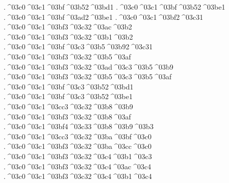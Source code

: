 {.^^^^03c0^^^^03c1^^^^03bf^^^^03b52^^^^03bd1 		%
.^^^^03c0^^^^03c1^^^^03bf^^^^03b52^^^^03be1 		%
.^^^^03c0^^^^03c1^^^^03bf^^^^03ad2^^^^03be1 		%
.^^^^03c0^^^^03c1^^^^03bf2^^^^03c31
	.^^^^03c0^^^^03c1^^^^03bf3^^^^03c32^^^^03ac^^^^03b2 		%
	.^^^^03c0^^^^03c1^^^^03bf3^^^^03c32^^^^03b1^^^^03b2
.^^^^03c0^^^^03c1^^^^03bf^^^^03c3^^^^03b5^^^^03b92^^^^03c31 		%
	.^^^^03c0^^^^03c1^^^^03bf3^^^^03c32^^^^03b5^^^^03af 		%
	.^^^^03c0^^^^03c1^^^^03bf3^^^^03c32^^^^03ad^^^^03c3^^^^03b5^^^^03b9
	.^^^^03c0^^^^03c1^^^^03bf3^^^^03c32^^^^03b5^^^^03c3^^^^03b5^^^^03af
.^^^^03c0^^^^03c1^^^^03bf^^^^03c3^^^^03b52^^^^03bd1 		%
.^^^^03c0^^^^03c1^^^^03bf^^^^03c3^^^^03b52^^^^03be1 		%
	.^^^^03c0^^^^03c1^^^^03cc3^^^^03c32^^^^03b8^^^^03b9 		%
	.^^^^03c0^^^^03c1^^^^03bf3^^^^03c32^^^^03b8^^^^03af
		.^^^^03c0^^^^03c1^^^^03bf4^^^^03c33^^^^03b8^^^^03b9^^^^03b3 		%
	.^^^^03c0^^^^03c1^^^^03cc3^^^^03c32^^^^03ba^^^^03bf^^^^03c0 		%
	.^^^^03c0^^^^03c1^^^^03bf3^^^^03c32^^^^03ba^^^^03cc^^^^03c0 
	.^^^^03c0^^^^03c1^^^^03bf3^^^^03c32^^^^03c4^^^^03b1^^^^03c3 		%
	.^^^^03c0^^^^03c1^^^^03bf3^^^^03c32^^^^03c4^^^^03ac^^^^03c4 		%
	.^^^^03c0^^^^03c1^^^^03bf3^^^^03c32^^^^03c4^^^^03b1^^^^03c4 		%
}
